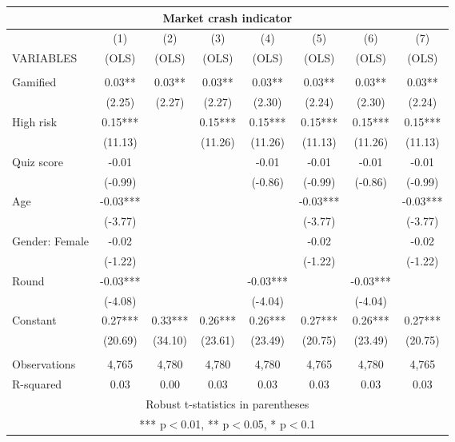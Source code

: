 \documentclass[]{article}
\begin{document}
\begin{tabular}{lccccccc}
\multicolumn{8}{c}{Market crash indicator} \\ \hline
 & (1) & (2) & (3) & (4) & (5) & (6) & (7) \\
VARIABLES & (OLS) & (OLS) & (OLS) & (OLS) & (OLS) & (OLS) & (OLS) \\ \hline
 &  &  &  &  &  &  &  \\
Gamified & 0.03** & 0.03** & 0.03** & 0.03** & 0.03** & 0.03** & 0.03** \\
 & (2.25) & (2.27) & (2.27) & (2.30) & (2.24) & (2.30) & (2.24) \\
High risk & 0.15*** &  & 0.15*** & 0.15*** & 0.15*** & 0.15*** & 0.15*** \\
 & (11.13) &  & (11.26) & (11.26) & (11.13) & (11.26) & (11.13) \\
Quiz score & -0.01 &  &  & -0.01 & -0.01 & -0.01 & -0.01 \\
 & (-0.99) &  &  & (-0.86) & (-0.99) & (-0.86) & (-0.99) \\
Age & -0.03*** &  &  &  & -0.03*** &  & -0.03*** \\
 & (-3.77) &  &  &  & (-3.77) &  & (-3.77) \\
Gender: Female & -0.02 &  &  &  & -0.02 &  & -0.02 \\
 & (-1.22) &  &  &  & (-1.22) &  & (-1.22) \\
Round & -0.03*** &  &  & -0.03*** &  & -0.03*** &  \\
 & (-4.08) &  &  & (-4.04) &  & (-4.04) &  \\
Constant & 0.27*** & 0.33*** & 0.26*** & 0.26*** & 0.27*** & 0.26*** & 0.27*** \\
 & (20.69) & (34.10) & (23.61) & (23.49) & (20.75) & (23.49) & (20.75) \\
 &  &  &  &  &  &  &  \\
Observations & 4,765 & 4,780 & 4,780 & 4,780 & 4,765 & 4,780 & 4,765 \\
 R-squared & 0.03 & 0.00 & 0.03 & 0.03 & 0.03 & 0.03 & 0.03 \\ \hline
\multicolumn{8}{c}{ Robust t-statistics in parentheses} \\
\multicolumn{8}{c}{ *** p$<$0.01, ** p$<$0.05, * p$<$0.1} \\
\end{tabular}
\end{document}
